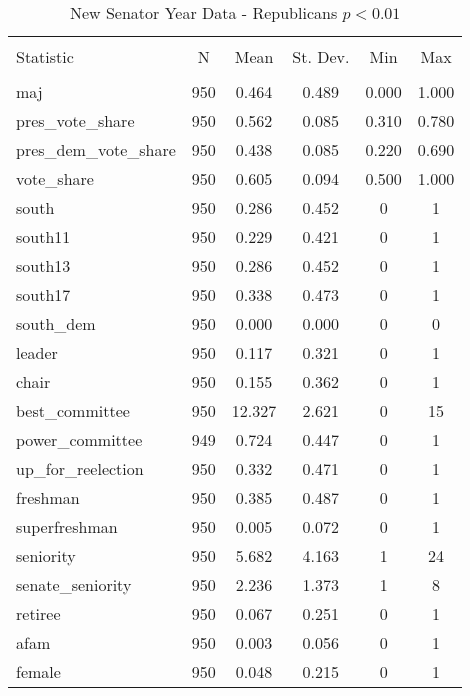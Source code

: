 \documentclass[12pt]{article}
\begin{document}
\begin{table}[!htbp] \centering 
	\caption{New Senator Year Data - Republicans $ p < 0.01 $} 
	\begin{tabular}{@{\extracolsep{5pt}}lccccc} 
		\\[-1.8ex]\hline 
		\hline \\[-1.8ex] 
		Statistic & \multicolumn{1}{c}{N} & \multicolumn{1}{c}{Mean} & \multicolumn{1}{c}{St. Dev.} & \multicolumn{1}{c}{Min} & \multicolumn{1}{c}{Max} \\ 
		\hline \\[-1.8ex] 
		maj & 950 & 0.464 & 0.489 & 0.000 & 1.000 \\ 
		pres\_vote\_share & 950 & 0.562 & 0.085 & 0.310 & 0.780 \\ 
		pres\_dem\_vote\_share & 950 & 0.438 & 0.085 & 0.220 & 0.690 \\ 
		vote\_share & 950 & 0.605 & 0.094 & 0.500 & 1.000 \\ 
		south & 950 & 0.286 & 0.452 & 0 & 1 \\ 
		south11 & 950 & 0.229 & 0.421 & 0 & 1 \\ 
		south13 & 950 & 0.286 & 0.452 & 0 & 1 \\ 
		south17 & 950 & 0.338 & 0.473 & 0 & 1 \\ 
		south\_dem & 950 & 0.000 & 0.000 & 0 & 0 \\ 
		leader & 950 & 0.117 & 0.321 & 0 & 1 \\ 
		chair & 950 & 0.155 & 0.362 & 0 & 1 \\ 
		best\_committee & 950 & 12.327 & 2.621 & 0 & 15 \\ 
		power\_committee & 949 & 0.724 & 0.447 & 0 & 1 \\ 
		up\_for\_reelection & 950 & 0.332 & 0.471 & 0 & 1 \\ 
		freshman & 950 & 0.385 & 0.487 & 0 & 1 \\ 
		superfreshman & 950 & 0.005 & 0.072 & 0 & 1 \\ 
		seniority & 950 & 5.682 & 4.163 & 1 & 24 \\ 
		senate\_seniority & 950 & 2.236 & 1.373 & 1 & 8 \\ 
		retiree & 950 & 0.067 & 0.251 & 0 & 1 \\ 
		afam & 950 & 0.003 & 0.056 & 0 & 1 \\ 
		female & 950 & 0.048 & 0.215 & 0 & 1 \\ 

\end{tabular}
\end{table}
\end{document}

